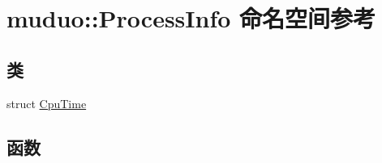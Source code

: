 \hypertarget{namespacemuduo_1_1ProcessInfo}{}\section{muduo\+:\+:Process\+Info 命名空间参考}
\label{namespacemuduo_1_1ProcessInfo}
\subsection*{类}
\begin{DoxyCompactItemize}
\item 
struct \hyperlink{structmuduo_1_1ProcessInfo_1_1CpuTime}{Cpu\+Time}
\end{DoxyCompactItemize}
\subsection*{函数}
